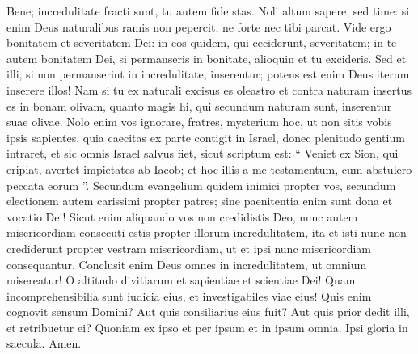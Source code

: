 \begin{biblechapter}
\begin{biblechapter}
\begin{biblechapter}
\begin{biblechapter}
\begin{biblechapter}
\begin{biblechapter}
\begin{biblechapter}
\begin{biblechapter}
\begin{biblechapter}
\begin{biblechapter}
\begin{biblechapter}
\verse Bene; incredulitate fracti sunt, tu autem fide stas. Noli altum sapere, sed time: 
\verse si enim Deus naturalibus ramis non pepercit, ne forte nec tibi parcat.
 \verse Vide ergo bonitatem et severitatem Dei: in eos quidem, qui ceciderunt, severitatem; in te autem bonitatem Dei, si permanseris in bonitate, alioquin et tu excideris. 
\verse Sed et illi, si non permanserint in incredulitate, inserentur; potens est enim Deus iterum inserere illos! 
\verse Nam si tu ex naturali excisus es oleastro et contra naturam insertus es in bonam olivam, quanto magis hi, qui secundum naturam sunt, inserentur suae olivae. 
\verse Nolo enim vos ignorare, fratres, mysterium hoc, ut non sitis vobis ipsis sapientes, quia caecitas ex parte contigit in Israel, donec plenitudo gentium intraret, 
 \verse et sic omnis Israel salvus fiet, sicut scriptum est:
 “ Veniet ex Sion, qui eripiat,
 avertet impietates ab Iacob;
 \verse et hoc illis a me testamentum,
 cum abstulero peccata eorum ”.
 \verse Secundum evangelium quidem inimici propter vos, secundum electionem autem carissimi propter patres; 
\verse sine paenitentia enim sunt dona et vocatio Dei! 
 \verse Sicut enim aliquando vos non credidistis Deo, nunc autem misericordiam consecuti estis propter illorum incredulitatem, 
\verse ita et isti nunc non crediderunt propter vestram misericordiam, ut et ipsi nunc misericordiam consequantur. 
\verse Conclusit enim Deus omnes in incredulitatem, ut omnium misereatur!
 \verse O altitudo divitiarum et sapientiae et scientiae Dei! Quam incomprehensibilia sunt iudicia eius, et investigabiles viae eius!
 \verse Quis enim cognovit sensum Domini?
 Aut quis consiliarius eius fuit?
 \verse Aut quis prior dedit illi,
 et retribuetur ei?
 \verse Quoniam ex ipso et per ipsum et in ipsum omnia. Ipsi gloria in saecula. Amen.
 

\end{biblechapter}
\end{biblechapter}
\end{biblechapter}
\end{biblechapter}
\end{biblechapter}
\end{biblechapter}
\end{biblechapter}
\end{biblechapter}
\end{biblechapter}
\end{biblechapter}
\end{biblechapter}
